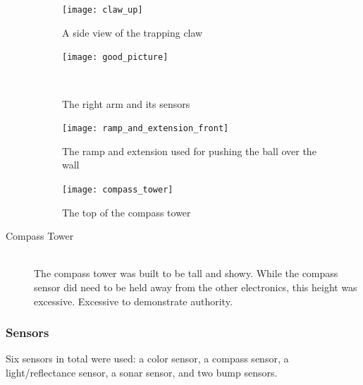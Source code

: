 \documentclass{article}
\begin{document}
\begin{description}
  \begin{figure}[h!]
    \centering
    \begin{minipage}{.5\textwidth}
      \centering
      \texttt{[image: claw\_up]}
      \caption{A side view of the trapping claw}
      \label{fig:claw_side}
    \end{minipage}%
    \begin{minipage}{.5\textwidth}
      \centering
      \texttt{[image: good\_picture]}
      \caption{The right arm and its sensors}
      \label{fig:caster_ball_underneath}
    \end{minipage} \\
    \label{fig:ball_trapping_apparatus}
  \end{figure}

  \begin{figure}[h!]
    \centering
    \begin{minipage}{0.5\textwidth}
      \centering
      \texttt{[image: ramp\_and\_extension\_front]}
      \caption{The ramp and extension used for pushing the ball over the wall}
      \label{fig:claw_side}
    \end{minipage}%
    \begin{minipage}{0.5\textwidth}
      \centering
      \texttt{[image: compass\_tower]}
      \caption{The top of the compass tower}
      \label{fig:compass_tower}
    \end{minipage}
  \end{figure}

  \item[Compass Tower] \hfill \\
  The compass tower was built to be tall and showy. While the compass sensor did need to be held away from the other electronics, this height was excessive. Excessive to demonstrate authority.
\end{description}

\subsubsection{Sensors}
Six sensors in total were used: a color sensor, a compass sensor, a light/reflectance sensor, a sonar sensor, and two bump sensors.
\end{document}
